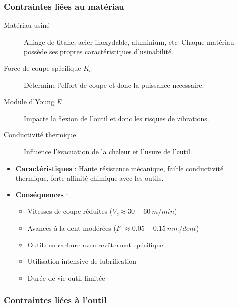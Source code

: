 \documentclass{article}
\begin{document}
\subsubsection{Contraintes liées au matériau}

\begin{description}
    \item[Matériau usiné] Alliage de titane, acier inoxydable, aluminium, etc. Chaque matériau possède ses propres caractéristiques d'usinabilité.
    \item[Force de coupe spécifique $K_c$] Détermine l'effort de coupe et donc la puissance nécessaire.
    \item[Module d'Young $E$] Impacte la flexion de l'outil et donc les risques de vibrations.
    \item[Conductivité thermique] Influence l'évacuation de la chaleur et l'usure de l'outil.
\end{description}

\begin{tcolorbox}[colback=green!5!white, colframe=green!50!black, title=Exemple : Usinage d'alliage de titane]
\begin{itemize}
    \item \textbf{Caractéristiques} : Haute résistance mécanique, faible conductivité thermique, forte affinité chimique avec les outils.
    \item \textbf{Conséquences} :
    \begin{itemize}
        \item Vitesses de coupe réduites ($V_c \approx 30-60 \ m/min$)
        \item Avances à la dent modérées ($F_z \approx 0.05-0.15 \ mm/dent$)
        \item Outils en carbure avec revêtement spécifique
        \item Utilisation intensive de lubrification
        \item Durée de vie outil limitée
    \end{itemize}
\end{itemize}
\end{tcolorbox}

\subsubsection{Contraintes liées à l'outil}
\end{document}
